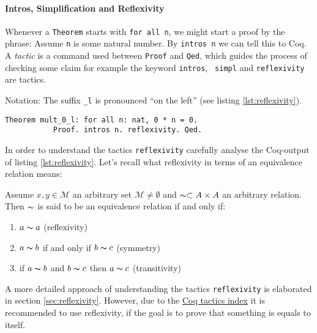 	    \paragraph{Intros, Simplification and Reflexivity}
	     Whenever a \lstinline!Theorem! starts with \lstinline!for all n!, we might start a proof by the phrase:
	     Assume \lstinline!n! is some natural number. By \lstinline!intros n! we can tell this to Coq.\\
	     A {\itshape tactic} is a command used between \lstinline!Proof! and \lstinline!Qed!, 
	     which guides the process of checking some claim for example the keyword \lstinline!intros!, \lstinline! simpl! and \lstinline!reflexivity! 
	     are tactics.     
	      \begin{remark}{Notation:} 
	     The suffix \lstinline!_l! is pronounced ``on the left'' (see listing \ref{lst:reflexivity}). 
	 	 \begin{lstlisting}[caption = \lstinline!mult_0_l!, label= {lst:reflexivity}]
		 Theorem mult_0_l: for all n: nat, 0 * n = 0.
		   Proof. intros n. reflexivity. Qed.
		 \end{lstlisting}
		 \end{remark} 
	      
	    In order to understand the tactics \lstinline!reflexivity! carefully analyse the Coq-output of listing \ref{lst:reflexivity}.   
	    Let's recall what reflexivity in terms of an equivalence relation means: 
	   \begin{definition}
	   Assume $x,y\in \mathcal{M}$ an arbitrary set $\mathcal{M}\neq\emptyset$ and $\thicksim\subset A \times A$ an arbitrary relation.
	   Then $\thicksim$ is said to be an equivalence relation if and only if:
	   \begin{enumerate}
	   \item $a\thicksim a$ (reflexivity)
	   \item $a \thicksim b$ if and only if $b \thicksim c$ (symmetry)
	   \item if $a \thicksim b$ and $ b\thicksim c$ then $a \thicksim c$ (transitivity) 
	   \end{enumerate}
	   \end{definition}
	     
	    A more detailed approach of understanding the tactics \lstinline!reflexivity! is elaborated in section \ref{sec:reflexivity}.  
	    However, due to the \href{https://pjreddie.com/coq-tactics/}{Coq tactics index} it is recommended to use reflexivity, if the goal is to prove that something is equals to itself.  
	      
